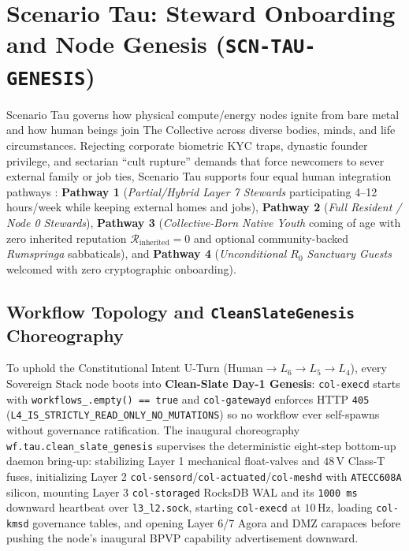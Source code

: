 \section{Scenario Tau: Steward Onboarding and Node Genesis (\texttt{SCN-TAU-GENESIS})}
\label{sec:wave-a-tau}

Scenario Tau governs how physical compute/energy nodes ignite from bare metal and how human beings
join The Collective across diverse bodies, minds, and life circumstances. Rejecting corporate
biometric KYC traps, dynastic founder privilege, and sectarian ``cult rupture'' demands that force
newcomers to sever external family or job ties, Scenario Tau supports four equal human integration
pathways \parencite{ostrom1990,hirschman1970}: \textbf{Pathway 1} (\textit{Partial/Hybrid Layer 7
Stewards} participating 4--12 hours/week while keeping external homes and jobs), \textbf{Pathway 2}
(\textit{Full Resident / Node 0 Stewards}), \textbf{Pathway 3} (\textit{Collective-Born Native Youth}
coming of age with zero inherited reputation $\mathcal{R}_{\mathrm{inherited}} = 0$ and optional
community-backed \textit{Rumspringa} sabbaticals), and \textbf{Pathway 4} (\textit{Unconditional
$R_0$ Sanctuary Guests} welcomed with zero cryptographic onboarding).

\subsection{Workflow Topology and \texttt{CleanSlateGenesis} Choreography}

To uphold the Constitutional Intent U-Turn ($\text{Human} \to L_6 \to L_5 \to L_4$), every Sovereign
Stack node boots into \textbf{Clean-Slate Day-1 Genesis}: \texttt{col-execd} starts with
\texttt{workflows\_.empty() == true} and \texttt{col-gatewayd} enforces HTTP \texttt{405}
(\texttt{L4\_IS\_STRICTLY\_READ\_ONLY\_NO\_MUTATIONS}) so no workflow ever self-spawns without
governance ratification. The inaugural choreography \texttt{wf.tau.clean\_slate\_genesis} supervises
the deterministic eight-step bottom-up daemon bring-up: stabilizing Layer 1 mechanical float-valves
and $48\,\mathrm{V}$ Class-T fuses, initializing Layer 2
\texttt{col-sensord}/\texttt{col-actuated}/\texttt{col-meshd} with \texttt{ATECC608A} silicon,
mounting Layer 3 \texttt{col-storaged} RocksDB WAL and its \texttt{1000 ms} downward heartbeat over
\texttt{l3\_l2.sock}, starting \texttt{col-execd} at $10\,\mathrm{Hz}$, loading \texttt{col-kmsd}
governance tables, and opening Layer 6/7 Agora and DMZ carapaces before pushing the node's inaugural
BPVP capability advertisement downward.

